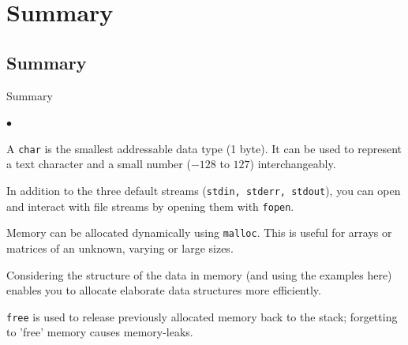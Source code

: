 \documentclass[smaller,handout,table]{beamer}
\begin{document}
\section{Summary}
\subsection{Summary}
\begin{frame}{Summary}
\begin{list}{$\bullet$}{}
\item A \texttt{char} is the smallest addressable data type (1 byte). It can be used to represent a text character and a small number ($-128$ to $127$) interchangeably.
\item In addition to the three default streams (\texttt{stdin, stderr, stdout}), you can open and interact with file streams by opening them with \texttt{fopen}.
\item Memory can be allocated dynamically using \texttt{malloc}. This is useful for arrays or matrices of an unknown, varying or large sizes.
\item Considering the structure of the data in memory (and using the examples here) enables you to allocate elaborate data structures more efficiently.
\item \texttt{free} is used to release previously allocated memory back to the stack; forgetting to 'free' memory causes memory-leaks.
\end{list}
\end{frame}
\end{document}

